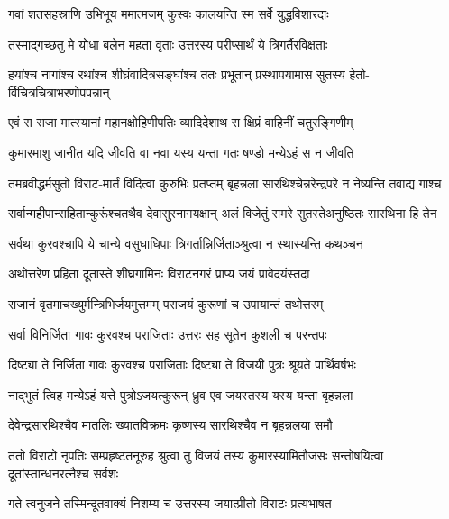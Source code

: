 \twolineshloka
{गवां शतसहस्राणि उभिभूय ममात्मजम्}
{कुस्वः कालयन्ति स्म सर्वे युद्धविशारदाः}


\twolineshloka
{तस्माद्गच्छतु मे योधा बलेन महता वृताः}
{उत्तरस्य परीप्सार्थं ये त्रिगर्तैरविक्षताः}



\twolineshloka
{हयांश्च नागांश्च रथांश्च शीघ्रंवादित्रसङ्घांश्च ततः प्रभूतान्}
{प्रस्थापयामास सुतस्य हेतो-र्विचित्रचित्राभरणोपपन्नान्}


\twolineshloka
{एवं स राजा मात्स्यानां महानक्षोहिणीपतिः}
{व्यादिदेशाथ स क्षिप्रं वाहिनीं चतुरङ्गिणीम्}


\twolineshloka
{कुमारमाशु जानीत यदि जीवति वा नवा}
{यस्य यन्ता गतः षण्डो मन्येऽहं स न जीवति}


\twolineshloka
{तमब्रवीद्धर्मसुतो विराट-मार्तं विदित्वा कुरुभिः प्रतप्तम्}
{बृहन्नला सारथिश्चेन्नरेन्द्रपरे न नेष्यन्ति तवाद्य गाश्च}


\twolineshloka
{सर्वान्महीपान्सहितान्कुरूंश्चतथैव देवासुरनागयक्षान्}
{अलं विजेतुं समरे सुतस्तेअनुष्ठितः सारथिना हि तेन}


\twolineshloka
{सर्वथा कुरवश्चापि ये चान्ये वसुधाधिपाः}
{त्रिगर्तान्निर्जिताञ्श्रुत्वा न स्थास्यन्ति कथञ्चन}



\twolineshloka
{अथोत्तरेण प्रहिता दूतास्ते शीघ्रगामिनः}
{विराटनगरं प्राप्य जयं प्रावेदयंस्तदा}


\twolineshloka
{राजानं वृतमाचख्युर्मन्त्रिभिर्जयमुत्तमम्}
{पराजयं कुरूणां च उपायान्तं तथोत्तरम्}


\twolineshloka
{सर्वा विनिर्जिता गावः कुरवश्च पराजिताः}
{उत्तरः सह सूतेन कुशली च परन्तपः}




\twolineshloka
{दिष्ट्या ते निर्जिता गावः कुरवश्च पराजिताः}
{दिष्ट्या ते विजयी पुत्रः श्रूयते पार्थिवर्षभः}


\twolineshloka
{नाद्भुतं त्विह मन्येऽहं यत्ते पुत्रोऽजयत्कुरून्}
{ध्रुव एव जयस्तस्य यस्य यन्ता बृहन्नला}


\twolineshloka
{देवेन्द्रसारथिश्चैव मातलिः ख्यातविक्रमः}
{कृष्णस्य सारथिश्चैव न बृहन्नलया समौ}



\threelineshloka
{ततो विराटो नृपतिः सम्प्रहृष्टतनूरुह}
{श्रुत्वा तु विजयं तस्य कुमारस्यामितौजसः}
{सन्तोषयित्वा दूतांस्तान्धनरत्नैश्च सर्वशः}


\twolineshloka
{गते त्वनुजने तस्मिन्दूतवाक्यं निशम्य च}
{उत्तरस्य जयात्प्रीतो विराटः प्रत्यभाषत}


